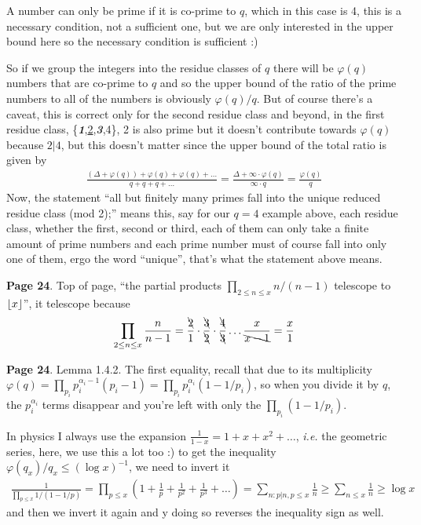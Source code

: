 \documentclass[aps,preprint,preprintnumbers,nofootinbib,showpacs,prd]{revtex4-1}
\newcommand{\ie}{{\it i.e.} }
\newcommand{\nbea}{\begin{eqnarray*}}
\newcommand{\neea}{\end{eqnarray*}}
\DeclarePairedDelimiter{\floor}{\lfloor}{\rfloor}
\begin{document}
A number can only be prime if it is co-prime to $q$, which in this case is 4, this is a necessary condition, not a sufficient one, but we are only interested in the upper bound here so the necessary condition is sufficient :)

So if we group the integers into the residue classes of $q$ there will be $\varphi(q)$ numbers that are co-prime to $q$ and so the upper bound of the ratio of the prime numbers to all of the numbers is obviously $\varphi(q)/q$. But of course there's a caveat, this is correct only for the second residue class and beyond, in the first residue class, \{\textbf{\textit 1},\underline{2},\textbf{\textit 3},4\}, 2 is also prime but it doesn't contribute towards $\varphi(q)$ because $2|4$, but this doesn't matter since the upper bound of the total ratio is given by
%
\nbea
\frac{(\Delta + \varphi(q)) + \varphi(q) + \varphi(q) + \dots }{q + q + q + \dots} = \frac{\Delta + \infty\cdot \varphi(q)}{\infty \cdot q} = \frac{\varphi(q)}{q}
\neea
%
Now, the statement ``all but finitely many primes fall into the unique reduced residue class (mod 2);'' means this, say for our $q=4$ example above, each residue class, whether the first, second or third, each of them can only take a finite amount of prime numbers and each prime number must of course fall into only one of them, ergo the word ``unique'', that's what the statement above means.

{\bf Page 24}. Top of page, ``the partial products $\prod_{2\le n\le x} n/(n-1)$ telescope to $\floor{x}$'', it telescope because
%
\nbea
\prod_{2\le n\le x} \frac{n}{n-1} = \frac{\bcancel{2}}{1}\cdot\frac{\bcancel{3}}{\bcancel{2}}\cdot\frac{\bcancel{4}}{\bcancel{3}} \dots \frac{x}{\bcancel{x-1}} = \frac{x}{1}
\neea
%

{\bf Page 24}. Lemma 1.4.2. The first equality, recall that due to its multiplicity $\varphi(q) = \prod_{p_i} p_i^{\alpha_i - 1}( p_i -1) = \prod_{p_i} p_i^{\alpha_i }( 1 -1/p_i)$, so when you divide it by $q$, the $p_i^{\alpha_i }$ terms disappear and you're left with only the $\prod_{p_i} ( 1 -1/p_i)$.

In physics I always use the expansion $\frac{1}{1-x} = 1 + x + x^2 + \dots$, \ie the geometric series, here, we use this a lot too :) to get the inequality $\varphi(q_x)/q_x \le (\log x)^{-1}$, we need to invert it
%
\nbea
\frac{1}{\prod_{p\le x}1/(1-1/p)} = \prod_{p\le x}\left(1 + \frac{1}{p} + \frac{1}{p^2} + \frac{1}{p^3} + \dots \right) = \sum_{n: p|n, p \le x} \frac{1}{n} \ge \sum_{n \le x} \frac{1}{n} \ge \log x
\neea
%
and then we invert it again and y doing so reverses the inequality sign as well.
\end{document}
